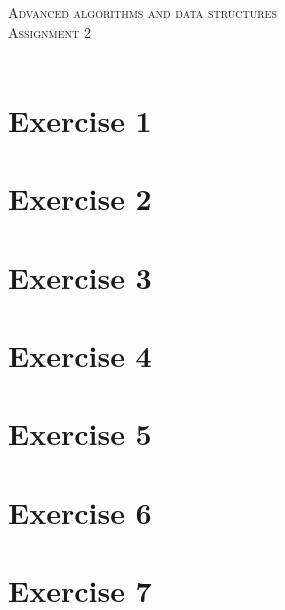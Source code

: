 \documentclass{article}
\begin{document}
\begin{center}
\textsc{\Large Advanced algorithms and data structures}\\[0.5cm]
\textsc{\large Assignment 2}\\[0.5cm]
\textsc{\large }\\[0.5cm]
\vspace{1 cm}
\end{center}

\section*{Exercise 1}


\newpage
\section*{Exercise 2}

\section*{Exercise 3}


\newpage
\section*{Exercise 4}



\newpage
\section*{Exercise 5}

\section*{Exercise 6}

\section*{Exercise 7}

\end{document}
